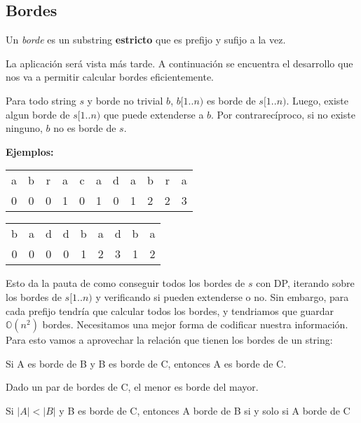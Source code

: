 
\subsection*{Bordes}

Un \textit{borde} es un substring \textbf{estricto} que es prefijo y sufijo a la vez.

La aplicación será vista más tarde. A continuación se encuentra el desarrollo que nos va a permitir calcular bordes eficientemente.

Para todo string $s$ y borde no trivial $b$, $b[1..n)$ es borde de $s[1..n)$. Luego, existe algun borde de $s[1..n)$ que puede extenderse a $b$. Por contrarecíproco, si no existe ninguno, $b$ no es borde de $s$.


\textbf{Ejemplos:}

\begin{tabular}{ccccccccccc}
    a & b & r & a & c & a & d & a & b & r & a \\
    0 & 0 & 0 & 1 & 0 & 1 & 0 & 1 & 2 & 2 & 3
\end{tabular}

\begin{tabular}{ccccccccc}
    b & a & d & d & b & a & d & b & a \\
    0 & 0 & 0 & 0 & 1 & 2 & 3 & 1 & 2
\end{tabular}
 
Esto da la pauta de como conseguir todos los bordes de $s$ con DP, iterando sobre los bordes de $s[1..n)$ y verificando si pueden extenderse o no. Sin embargo, para cada prefijo tendría que calcular todos los bordes, y tendriamos que guardar $\mathds{O}(n^2)$ bordes. Necesitamos una mejor forma de codificar nuestra información. Para esto vamos a aprovechar la relación que tienen los bordes de un string:

\begin{lema}
    Si A es borde de B y B es borde de C, entonces A es borde de C.
\end{lema}

\begin{lema}
    Dado un par de bordes de C, el menor es borde del mayor.
\end{lema}

\begin{corolario}
    Si $|A| < |B|$ y B es borde de C, entonces A borde de B si y solo si A borde de C
\end{corolario}

